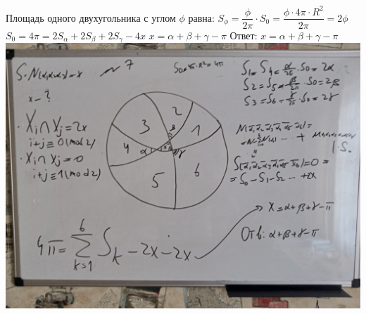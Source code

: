 \documentclass[12pt,a4paper,fleqn]{article}
\begin{document}
Площадь одного двухугольника с углом $\phi$ равна: $S_\phi = \dfrac{\phi}{2 \pi} \cdot S_0 = \dfrac{\phi \cdot 4\pi \cdot R^2}{2 \pi} = 2 \phi$ \newline
$S_0 = 4\pi = 2S_\alpha + 2S_\beta + 2S_\gamma - 4x$ \newline
$x = \alpha + \beta + \gamma - \pi$ \newline
Ответ: $x = \alpha + \beta + \gamma - \pi$ \newline \newline
\includegraphics[scale=0.2]{ZKZU4eacRnk.jpg}
\end{document}
